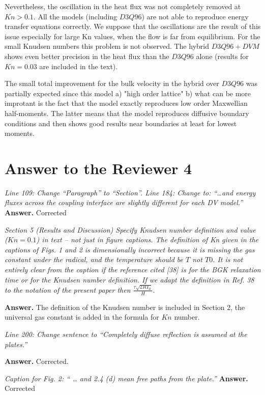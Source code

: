 \documentclass{article}
\begin{document}
 Nevertheless, the  oscillation in the heat flux  was not completely removed at $Kn>0.1$. All the models (including $D3Q96$) are not able  to reproduce  energy transfer equations correctly. We suppose  that the  oscillations are the result of this issue
 especially for  large Kn values, when the flow is far from equilibrium.
  For the small Knudsen numbers this  problem is not observed.
  The  hybrid $D3Q96+DVM$ shows  even better precision in the  heat flux than the  $D3Q96$ alone (results for $Kn=0.03$ are  included in the  text).

 The  small total improvement for the bulk velocity in the  hybrid  over $D3Q96$  was  partially expected since  this  model a) "high order lattice"  b) what can be more improtant is the fact that the model  exactly reproduces  low order Maxwellian half-moments. The latter  means  that the  model reproduces diffusive boundary conditions and then shows  good results  near boundaries at least for lowest  moments.



\section*{ Answer to the Reviewer 4}

{\it Line 109: Change “Paragraph” to “Section”.
Line 184: Change to: “…and energy fluxes across the coupling interface are slightly different for
each DV model.” 
}
{\bf Answer.} Corrected

{\it Section 5 (Results and Discussion)
Specify Knudsen number definition and value ($Kn = 0.1$) in text – not just in figure captions. The
definition of Kn given in the captions of Figs. 1 and 2 is dimensionally incorrect because it is
missing the gas constant under the radical, and the temperature should be $T$ not $T0$. It is not
entirely clear from the caption if the reference cited [38] is for the BGK relaxation time or for the
Knudsen number definition. If we adapt the definition in Ref. 38 to the notation of the present
paper then $\frac{\tau\sqrt{2RT_0}}{H}$.}

{\bf Answer.}  The definition of the Knudsen number is  included in Section 2,  the universal gas  constant  is  added in the formula for $Kn$ number.


{\it Line 200: Change sentence to “Completely diffuse reflection is assumed at the plates.” }

{\bf Answer.} Corrected.


{\it Caption for Fig. 2: “ … and 2.4 (d) mean free paths from the plate.”}
{\bf Answer.} Corrected
\end{document}
